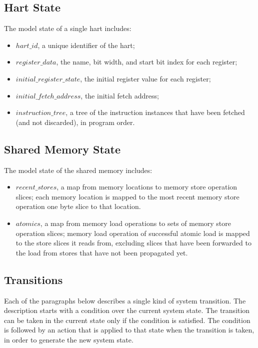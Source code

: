 \subsection{Hart State}
The model state of a single hart includes:
\begin{itemize}
\item $hart\_id$, a unique identifier of the hart;
\item $register\_data$, the name, bit width, and start bit index for each register;
\item $initial\_register\_state$, the initial register value for each register;
\item $initial\_fetch\_address$, the initial fetch address;
\item $instruction\_tree$, a tree of the instruction instances that have been fetched (and not discarded), in program order.
\end{itemize}


\subsection{Shared Memory State}
The model state of the shared memory includes:
\begin{itemize}
\item $recent\_stores$, a map from memory locations to memory store operation slices;
each memory location is mapped to the most recent memory store operation one byte slice to that location.
\item $atomics$, a map from memory load operations to sets of memory store operation slices;
memory load operation of successful atomic load is mapped to the store slices it reads from, excluding slices that have been forwarded to the load from stores that have not been propagated yet.
\end{itemize}


\subsection{Transitions}\label{sec:omm:transitions}

Each of the paragraphs below describes a single kind of system transition.
The description starts with a condition over the current system state.
The transition can be taken in the current state only if the condition is satisfied.
The condition is followed by an action that is applied to that state when the transition is taken, in order to generate the new system state.

